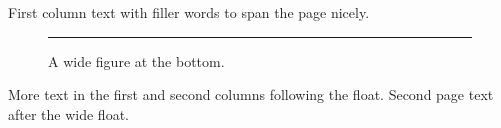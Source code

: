 \documentclass[twocolumn]{article}
\begin{document}
First column text with filler words to span the page nicely.
\begin{figure}[b]
\centering
\rule{10cm}{2cm}
\caption{A wide figure at the bottom.}
\end{figure}
More text in the first and second columns following the float.
\newpage
Second page text after the wide float.
\end{document}
